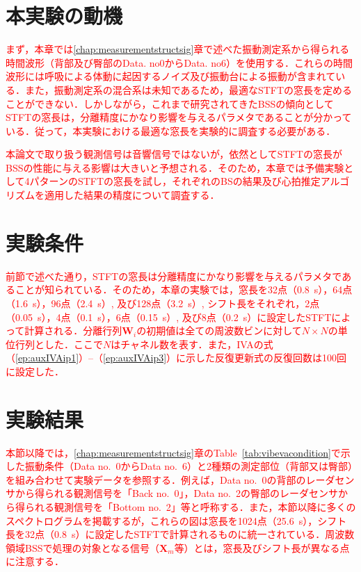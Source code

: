 \section{本実験の動機}
\label{sec:conv:expmotivation}
\textcolor{red}{まず，本章では\ref{chap:measurementstructsig}章で述べた振動測定系から得られる時間波形（背部及び臀部のData. no0からData. no6）を使用する．これらの時間波形には呼吸による体動に起因するノイズ及び振動台による振動が含まれている．また，振動測定系の混合系は未知であるため，最適なSTFTの窓長を定めることができない．しかしながら，これまで研究されてきたBSSの傾向としてSTFTの窓長は，分離精度にかなり影響を与えるパラメタであることが分かっている\cite{winlengthBSS}．従って，本実験における最適な窓長を実験的に調査する必要がある．}

\textcolor{red}{本論文で取り扱う観測信号は音響信号ではないが，依然としてSTFTの窓長がBSSの性能に与える影響は大きいと予想される．そのため，本章では予備実験として4パターンのSTFTの窓長を試し，それぞれのBSの結果及び心拍推定アルゴリズムを適用した結果の精度について調査する．}

\section{実験条件}
\label{sec:conv:expcondition4}
\textcolor{red}{前節で述べた通り，STFTの窓長は分離精度にかなり影響を与えるパラメタであることが知られている．そのため，本章の実験では，窓長を32点（0.8~s），64点（1.6~s），96点（2.4~s）, 及び128点（3.2~s）, シフト長をそれぞれ，2点（0.05~s），4点（0.1~s），6点（0.15~s）, 及び8点（0.2~s）に設定したSTFTによって計算される．分離行列$\bm{W}_{i}$の初期値は全ての周波数ビンに対して$N\times N$の単位行列とした．ここで$N$はチャネル数を表す．また，IVAの式（\ref{ep:auxIVAip1}）--（\ref{ep:auxIVAip3}）に示した反復更新式の反復回数は100回に設定した．}

\section{実験結果}
\label{sec:conv:expresult4}

\textcolor{red}{本節以降では，\ref{chap:measurementstructsig}章のTable~\ref{tab:vibevacondition}で示した振動条件（Data no.~0からData no.~6）と2種類の測定部位（背部又は臀部）を組み合わせて実験データを参照する．例えば，Data no.~0の背部のレーダセンサから得られる観測信号を「Back no.~0」，Data no.~2の臀部のレーダセンサから得られる観測信号を「Bottom no.~2」等と呼称する．また，本節以降に多くのスペクトログラムを掲載するが，これらの図は窓長を1024点（25.6~s），シフト長を32点（0.8~s）に設定したSTFTで計算されるものに統一されている．周波数領域BSSで処理の対象となる信号（$\bm{X}_m$等）とは，窓長及びシフト長が異なる点に注意する．}


